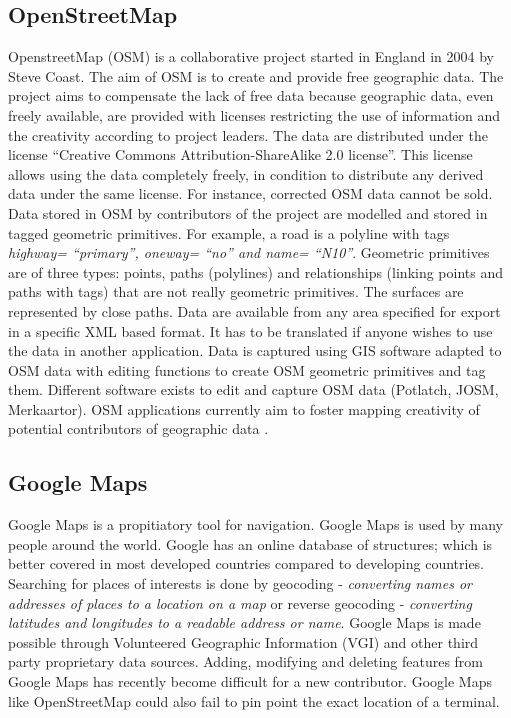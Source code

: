 \subsection{OpenStreetMap}
OpenstreetMap (OSM) is a collaborative project started in England in 2004 by Steve Coast. The aim of OSM is to create and provide free geographic data. The project aims to compensate the lack of free data because geographic data, even freely available, are provided with licenses restricting the use of information and the creativity according to project leaders. The data are distributed under the license “Creative Commons Attribution-ShareAlike 2.0 license”. This license allows using the data completely freely, in condition to distribute any derived data under the same license. For instance, corrected OSM data cannot be sold.
Data stored in OSM by contributors of the project are modelled and stored in tagged geometric primitives. For example, a road is a polyline with tags \textit{highway= “primary”, oneway= “no” and name= “N10”}. Geometric primitives are of three types: points, paths (polylines) and relationships (linking points and paths with tags) that are not really geometric primitives. The surfaces are represented by close paths. Data are available from any area specified for export in a specific XML based format. It has to be translated if anyone wishes to use the data in another application. Data is captured using GIS software adapted to OSM data with editing functions to create OSM geometric primitives and tag them. Different software exists to edit and capture OSM data (Potlatch, JOSM, Merkaartor). OSM applications currently aim to foster mapping creativity of potential contributors of geographic data \citep{girres_quality_2010}.

\subsection{Google Maps}
Google Maps is a propitiatory tool for navigation. Google Maps is used by many people around the world. Google has an online database of structures; which is better covered in most developed countries compared to developing countries. Searching for places of interests is done by geocoding - \textit{converting names or addresses of places to a location on a map} or reverse geocoding - \textit{converting latitudes and longitudes to a readable address or name}. Google Maps is made possible through Volunteered Geographic Information (VGI) and other third party proprietary data sources. Adding, modifying and deleting features from Google Maps has recently become difficult for a new contributor. Google Maps like OpenStreetMap could also fail to pin point the exact location of a terminal.

